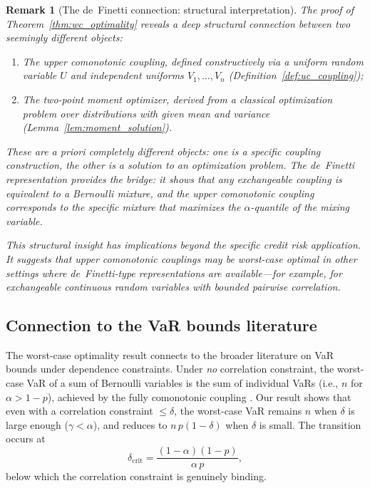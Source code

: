 \documentclass[11pt]{article}
\newtheorem{remark}[theorem]{Remark}
\theoremstyle{definition}
\newcommand{\1}{\mathbf{1}}
\begin{document}
\begin{remark}[The de~Finetti connection: structural interpretation]\label{rem:definetti_structure}
The proof of Theorem~\ref{thm:wc_optimality} reveals a deep structural connection between two seemingly different objects:
\begin{enumerate}[label=(\roman*)]
  \item The \emph{upper comonotonic coupling}, defined constructively via a uniform random variable $U$ and independent uniforms $V_1, \ldots, V_n$ (Definition~\ref{def:uc_coupling});
  \item The \emph{two-point moment optimizer}, derived from a classical optimization problem over distributions with given mean and variance (Lemma~\ref{lem:moment_solution}).
\end{enumerate}
These are a priori completely different objects: one is a specific coupling construction, the other is a solution to an optimization problem. The de~Finetti representation provides the bridge: it shows that any exchangeable coupling is equivalent to a Bernoulli mixture, and the upper comonotonic coupling corresponds to the specific mixture that maximizes the $\alpha$-quantile of the mixing variable.

This structural insight has implications beyond the specific credit risk application. It suggests that upper comonotonic couplings may be worst-case optimal in other settings where de~Finetti-type representations are available---for example, for exchangeable continuous random variables with bounded pairwise correlation.
\end{remark}

\subsection{Connection to the VaR bounds literature}

The worst-case optimality result connects to the broader literature on VaR bounds under dependence constraints. Under \emph{no} correlation constraint, the worst-case VaR of a sum of Bernoulli variables is the sum of individual VaRs (i.e., $n$ for $\alpha > 1-p$), achieved by the fully comonotonic coupling \citep{Ruschendorf1982, EmbrechtsEtAl2006}. Our result shows that even with a correlation constraint $\leq \delta$, the worst-case VaR remains $n$ when $\delta$ is large enough ($\gamma < \alpha$), and reduces to $n\,p(1-\delta)$ when $\delta$ is small. The transition occurs at
\begin{equation}\label{eq:delta_crit}
  \delta_{\mathrm{crit}} = \frac{(1-\alpha)(1-p)}{\alpha\,p},
\end{equation}
below which the correlation constraint is genuinely binding.
\end{document}
